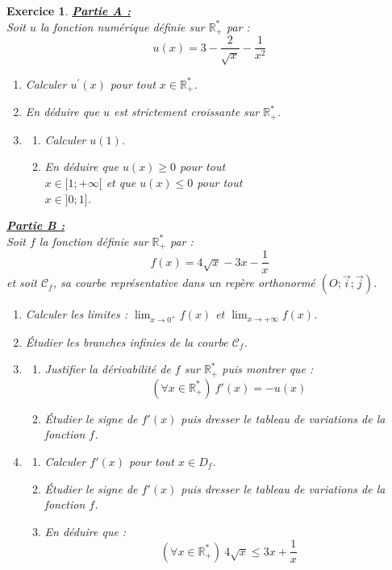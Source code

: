 \documentclass[12pt,a4paper]{article}
\newcommand{\Lim}{\displaystyle\lim}
\theoremstyle{mystyle}
\newtheorem{exo}{Exercice}
\begin{document}
\begin{multicols*}{2}
\begin{exo}
\text{ }
\underline{\textbf{Partie A : }}\\
Soit $u$ la fonction numérique définie sur $\mathbb{R}^*_+$ par :
$$u(x) = 3 - \dfrac{2}{\sqrt{x}} - \dfrac{1}{x^2}$$
\begin{enumerate}
	\item Calculer $u^{\prime}(x)$ pour tout $x\in\mathbb{R}^*_+$.
	\item En déduire que $u$ est strictement croissante sur $\mathbb{R}^*_+$.
	\item 
		\begin{enumerate}
			\item Calculer $u(1)$.
			\item En déduire que $u(x)\geq 0$ pour tout\\ $x\in[1;+\infty[$ et que $u(x) \leq 0$ pour tout\\ $x\in]0;1]$.
		\end{enumerate}
\end{enumerate}

\underline{\textbf{Partie B : }}\\
Soit $f$ la fonction définie sur $\mathbb{R}^*_+$ par :
\[
f(x) = 4 \sqrt{x} - 3x - \frac{1}{x}
\]
et soit $\mathcal{C}_f$, sa courbe représentative dans un repère orthonormé $(O; \vec{i}; \vec{j})$.

\begin{enumerate}
    \item[a)] Calculer les limites : $\Lim_{x \to 0^+} f(x)$ et $\Lim_{x \to +\infty} f(x)$.
    \item[b)] Étudier les branches infinies de la courbe $\mathcal{C}_f$.
    
    \item[2)] 
    \begin{enumerate}
        \item[a)] Justifier la dérivabilité de $f$ sur $\mathbb{R}^*_+$ puis montrer que :
        \[
        (\forall x \in \mathbb{R}^*_+) \ f'(x) = -u(x)
        \]
        \item[b)] Étudier le signe de $f'(x)$ puis dresser le tableau de variations de la fonction $f$.
    \end{enumerate}
    
    \item[3)] 
    \begin{enumerate}
        \item[a)] Calculer $f'(x)$ pour tout $x \in D_f$.
        \item[b)] Étudier le signe de $f'(x)$ puis dresser le tableau de variations de la fonction $f$.
        \item[c)] En déduire que :
        \[
        (\forall x \in \mathbb{R}^*_+) \ 4\sqrt{x} \leq 3x + \frac{1}{x}
        \]
    \end{enumerate}
    

\end{enumerate}
\end{exo}
\end{multicols*}
\end{document}
